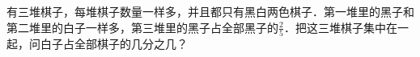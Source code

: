 
有三堆棋子，每堆棋子数量一样多，并且都只有黑白两色棋子．第一堆里的黑子和第二堆里的白子一样多，第三堆里的黑子占全部黑子的$\frac{2}{5}$．把这三堆棋子集中在一起，问白子占全部棋子的几分之几？\\[6em]


